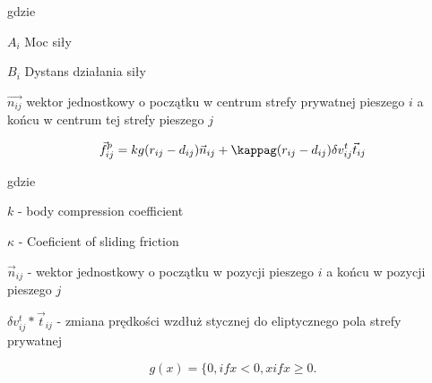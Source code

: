 gdzie
\begin{eqwhere}[2cm]
	\item[$A_{i}$] Moc siły
	\item[$B_{i}$] Dystans działania siły
	\item[$\vec{n_{ij}}$] wektor jednostkowy o początku w centrum strefy prywatnej pieszego $i$ a końcu w centrum tej strefy pieszego $j$
\end{eqwhere}

\begin{equation}
\vec{f}_{ij}^{p} = kg(r_{ij} - d_{ij}) \vec{n}_{ij} + \kappag (r_{ij} - d_{ij}) \delta v _{ij}^{t} \vec{t}_{ij}
\end{equation}

gdzie
\begin{eqwhere}[2cm]
	\item[$k$] - body compression coefficient
	\item[$\kappa$] - Coeficient of sliding friction
	\item[$\vec{n}_{ij}$] - wektor jednostkowy o początku w pozycji pieszego $i$ a końcu w pozycji pieszego $j$
	\item[$\delta v_{ij}^{t} * \vec{t}_{ij}$] - zmiana prędkości wzdłuż stycznej do eliptycznego pola strefy prywatnej
\end{eqwhere}

\begin{equation}
g(x) = \lbrace {0, if x < 0, x if x \geq 0.}
\end{equation}
